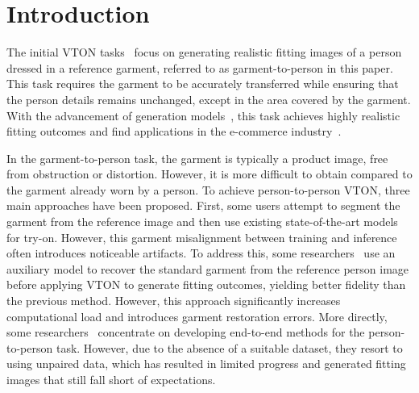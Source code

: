 

\section{Introduction}
\label{sec:intro}


%  

The initial VTON tasks~\cite{choi2021viton, morelli2022dress, kim2024stableviton, choi2024improving, xu2024ootdiffusion, zhang2024boow} focus on generating realistic fitting images of a person dressed in a reference garment, referred to as garment-to-person in this paper. This task requires the garment to be accurately transferred while ensuring that the person details remains unchanged, except in the area covered by the garment. With the advancement of generation models~\cite{goodfellow2014generative,isola2017image, ho2020denoising, song2020denoising, rombach2022high, esser2024scaling}, this task achieves highly realistic fitting outcomes and find applications in the e-commerce industry~\cite{zalando2024}. 

In the garment-to-person task, the garment is typically a product image, free from obstruction or distortion. However, it is more difficult to obtain compared to the garment already worn by a person. To achieve person-to-person VTON, three main approaches have been proposed. First, some users attempt to segment the garment from the reference image and then use existing state-of-the-art models for try-on. However, this garment misalignment between training and inference often introduces noticeable artifacts. To address this, some researchers~\cite{zeng2020TileGAN, velioglu2024tryoffdiff,xarchakos2024tryoffanyonetiledclothgeneration, tan2024ragdiffusion, shen2024igrimprovingdiffusionmodel} use an auxiliary model to recover the standard garment from the reference person image before applying VTON to generate fitting outcomes, yielding better fidelity than the previous method. However, this approach significantly increases computational load and introduces garment restoration errors. More directly, some researchers~\cite{xie2022pasta,cui2024street} concentrate on developing end-to-end methods for the person-to-person task. However, due to the absence of a suitable dataset, they resort to using unpaired data, which has resulted in limited progress and generated fitting images that still fall short of expectations.

